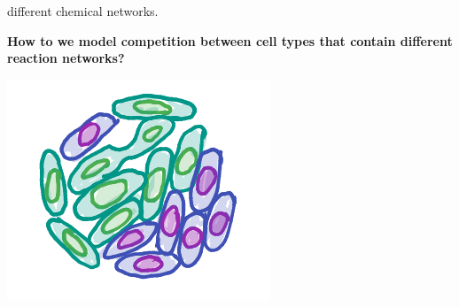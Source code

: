 \documentclass[a0,portrait]{a0poster}
\begin{document}
\begin{multicols}{3}
different chemical networks.
\\
\begin{tcolorbox}[boxrule=2pt,arc=3.4pt,boxsep=2mm]
\begin{center}\color{DarkRed}
\textbf{How to we model competition between cell types that contain
different reaction networks?}
\end{center}
\end{tcolorbox}
\begin{center}
\includegraphics[width=0.9\linewidth]{competition}
\end{center}
\vfill\null
\columnbreak

\end{multicols}
\end{document}
